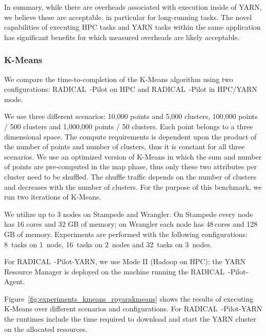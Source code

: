 In summary, while there are overheads associated with execution inside of YARN, we believe these are acceptable, in particular for long-running tasks.
The novel capabilities of executing HPC tasks and YARN tasks within the same application has significant benefits for which measured overheads are likely acceptable.

\subsubsection{K-Means}
\label{sssec:kmeans}
We compare the time-to-completion of the K-Means algorithm using two configurations: RADICAL~-Pilot on HPC and RADICAL~-Pilot in HPC/YARN mode. 

We use three different scenarios: 10,000 points and 5,000 clusters, 100,000 points / 500 clusters and 1,000,000 points / 50 clusters.
Each point belongs to a three dimensional space.
The compute requirements is dependent upon the product of the number of points and number of clusters, thus it is constant for all three scenarios.
We use an optimized version of K-Means in which the sum and number of points are pre-computed in the map phase, thus only these two attributes per cluster need to be shuffled.
The shuffle traffic depends on the number of clusters and decreases with the number of clusters.
For the purpose of this benchmark, we run two iterations of K-Means.

We utilize up to 3 nodes on Stampede and Wrangler.
On Stampede every node has 16 cores and 32 GB of memory; on Wrangler each node has 48\,cores and 128\,GB of memory.
Experiments are performed with the following configurations: 8~tasks on 1~node, 16~tasks on 2~nodes and 32~tasks on 3~nodes.

For RADICAL~-Pilot-YARN, we use Mode II (Hadoop on HPC): the YARN Resource Manager is deployed on the machine running the RADICAL~-Pilot-Agent.

Figure~\ref{fig:experiments_kmeans_rpyarnkmeans} shows the results of executing K-Means over different scenarios and configurations.
For RADICAL~-Pilot-YARN the runtimes include the time required to download and start the YARN cluster on the allocated resources.


